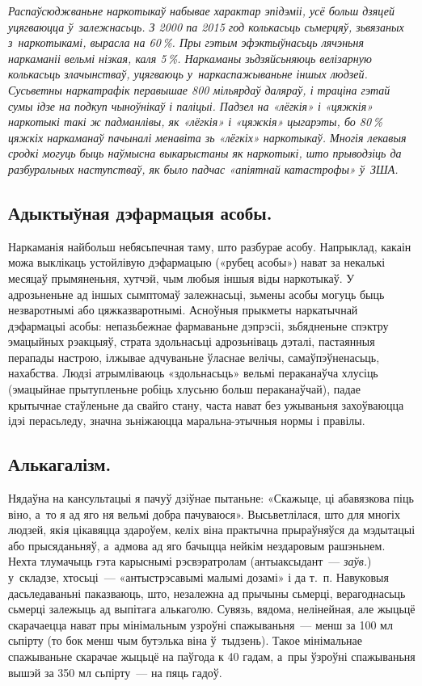 \emph{Распаўсюджваньне наркотыкаў набывае характар эпідэміі, усё больш дзяцей уцягваюцца ў~залежнасьць. З 2000 па 2015 год колькасьць сьмерцяў, зьвязаных з~наркотыкамі, вырасла на 60\,\%. Пры гэтым эфэктыўнасьць лячэньня наркаманіі вельмі нізкая, каля 5\,\%. Наркаманы зьдзяйсьняюць велізарную колькасьць злачынстваў, уцягваюць у~наркаспажываньне іншых людзей. Сусьветны наркатрафік перавышае 800 мільярдаў даляраў, і траціна гэтай сумы ідзе на подкуп чыноўнікаў і паліцыі. Падзел на «лёгкія» і «цяжкія» наркотыкі такі ж падманлівы, як «лёгкія» і «цяжкія» цыгарэты, бо 80\,\% цяжкіх наркаманаў пачыналі менавіта зь «лёгкіх» наркотыкаў. Многія лекавыя сродкі могуць быць наўмысна выкарыстаны як наркотыкі, што прыводзіць да разбуральных наступстваў, як было падчас «апіятнай катастрофы» ў~ЗША.}

\subsection*{Адыктыўная дэфармацыя асобы.}

Наркаманія найбольш небясьпечная таму, што разбурае асобу. Напрыклад, какаін можа выклікаць устойлівую дэфармацыю («рубец асобы») нават за некалькі месяцаў прымяненьня, хутчэй, чым любыя іншыя віды наркотыкаў. У адрозьненьне ад іншых сымптомаў залежнасьці, зьмены асобы могуць быць незваротнымі або цяжказваротнымі. Асноўныя прыкметы наркатычнай дэфармацыі асобы: непазьбежнае фармаваньне дэпрэсіі, зьбядненьне спэктру эмацыйных рэакцыяў, страта здольнасьці адрозьніваць дэталі, пастаянныя перапады настрою, ілжывае адчуваньне ўласнае велічы, самаўпэўненасьць, нахабства. Людзі атрымліваюць «здольнасьць» вельмі пераканаўча хлусіць (эмацыйнае прытупленьне робіць хлусьню больш пераканаўчай), падае крытычнае стаўленьне да свайго стану, часта нават без ужываньня захоўваюцца ідэі перасьледу, значна зьніжаюцца маральна-этычныя нормы і правілы.

\subsection*{Алькагалізм.} 

Нядаўна на кансультацыі я пачуў дзіўнае пытаньне: «Скажыце, ці абавязкова піць віно, а~то я ад яго ня вельмі добра пачуваюся». Высьветлілася, што для многіх людзей, якія цікавяцца здароўем, келіх віна практычна прыраўняўся да мэдытацыі або прысяданьняў, а~адмова ад яго бачыцца нейкім нездаровым рашэньнем. Нехта тлумачыць гэта карыснымі рэсвэратролам (антыаксыдант~--- \emph{заўв.}) у~складзе, хтосьці~--- «антыстрэсавымі малымі дозамі» і да т.~п. Навуковыя дасьледаваньні паказваюць, што, незалежна ад прычыны сьмерці, верагоднасьць сьмерці залежыць ад выпітага алькаголю. Сувязь, вядома, нелінейная, але жыцьцё скарачаецца нават пры мінімальным узроўні спажываньня~--- менш за 100 мл сьпірту (то бок менш чым бутэлька віна ў~тыдзень). Такое мінімальнае спажываньне скарачае жыцьцё на паўгода к 40 гадам, а~пры ўзроўні спажываньня вышэй за 350 мл сьпірту~--- на пяць гадоў.

